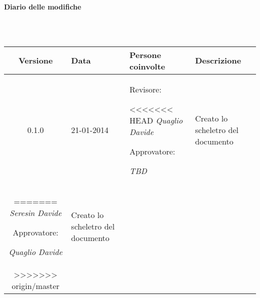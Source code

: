 \noindent\begin{Large}\textbf{Diario delle modifiche}\end{Large}\\
\\
\begin{small}
\begin{tabular}{|c|p{1.7cm}|p{2.8cm}|p{7cm}|}
\hline
Versione & Data & Persone coinvolte & Descrizione \\
\hline
\hline
0.1.0 & 21-01-2014 & Revisore: 

<<<<<<< HEAD
\textit{Quaglio Davide}

Approvatore: 

\textit{TBD} &  Creato lo scheletro del documento\\
=======
\textit{Seresin Davide}

Approvatore: 

\textit{Quaglio Davide} &  Creato lo scheletro del documento\\
>>>>>>> origin/master
\hline
\end{tabular}\\
\end{small}